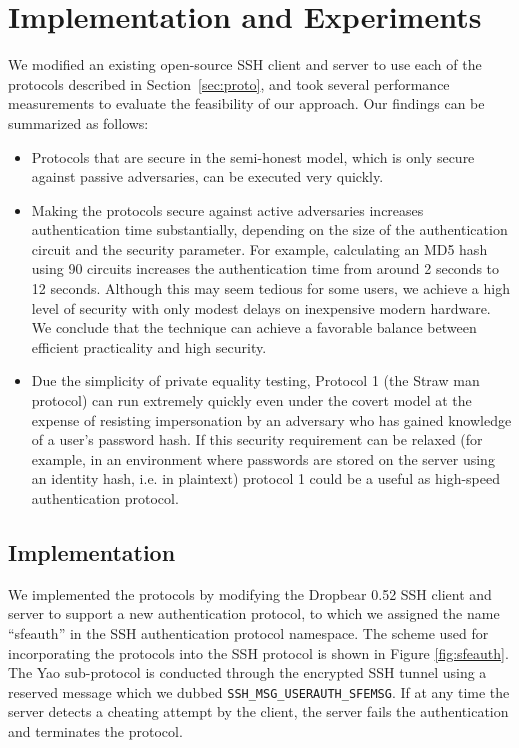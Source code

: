 
\section{Implementation and Experiments}
\label{sec:eval}

We modified an existing open-source SSH client and server to use each
of the protocols described in Section~\ref{sec:proto}, and took
several performance measurements to evaluate the feasibility of our
approach. Our findings can be summarized as follows:
\begin{itemize}
\item Protocols that are secure in the semi-honest model, which is only 
secure against passive adversaries, can be executed very quickly.
\item Making the protocols secure against active adversaries
increases authentication time substantially, depending on the size of
the authentication circuit and the security parameter.  For example,
calculating an MD5 hash using 90 circuits increases the authentication
time from around 2 seconds to 12 seconds.  Although this may seem
tedious for some users, we achieve a high level of security with only
modest delays on inexpensive modern hardware.  We conclude that the technique
can achieve a favorable balance between efficient practicality and high
security.

\item Due the simplicity of private equality testing, Protocol 1 (the Straw man protocol)
can run extremely quickly even under the covert model at the expense
of resisting impersonation by an adversary who has gained knowledge of
a user's password hash.  If this security requirement can be relaxed
(for example, in an environment where passwords are stored on the
server using an identity hash, i.e. in plaintext) protocol 1 could be
a useful as high-speed authentication protocol.
\end{itemize}

\subsection{Implementation}

We implemented the protocols by modifying the Dropbear 0.52 SSH client
and server to support a new authentication protocol, to which we
assigned the name {}``sfeauth'' in the SSH authentication protocol
namespace. The scheme used for incorporating the protocols into the
SSH protocol is shown in Figure \ref{fig:sfeauth}. The Yao
sub-protocol is conducted through the encrypted SSH tunnel using a
reserved message which we dubbed
\texttt{SSH\_MSG\_USERAUTH\_SFEMSG}. If at any time the server detects
a cheating attempt by the client, the server fails the authentication
and terminates the protocol.


